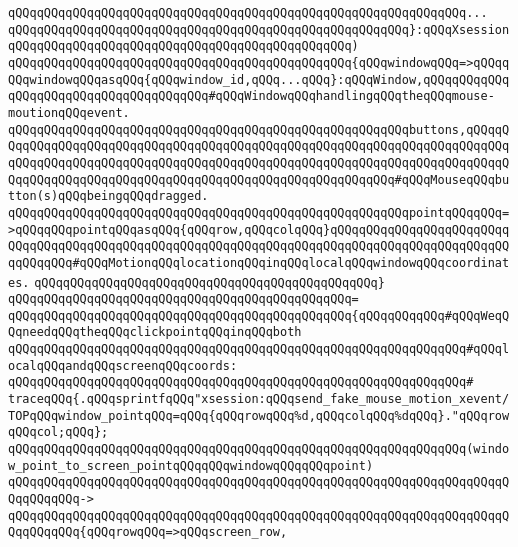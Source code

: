 \verb|qQQqqQQqqQQqqQQqqQQqqQQqqQQqqQQqqQQqqQQqqQQqqQQqqQQqqQQqqQQqqQQq...|\newline
\verb|qQQqqQQqqQQqqQQqqQQqqQQqqQQqqQQqqQQqqQQqqQQqqQQqqQQqqQQq}:qQQqXsession|\newline
\verb|qQQqqQQqqQQqqQQqqQQqqQQqqQQqqQQqqQQqqQQqqQQqqQQq)|\newline
\verb|qQQqqQQqqQQqqQQqqQQqqQQqqQQqqQQqqQQqqQQqqQQqqQQq{qQQqwindowqQQq=>qQQqqQQqwindowqQQqasqQQq{qQQqwindow_id,qQQq...qQQq}:qQQqWindow,qQQqqQQqqQQqqQQqqQQqqQQqqQQqqQQqqQQqqQQq#qQQqWindowqQQqhandlingqQQqtheqQQqmouse-moutionqQQqevent.|\newline
\verb|qQQqqQQqqQQqqQQqqQQqqQQqqQQqqQQqqQQqqQQqqQQqqQQqqQQqqQQqbuttons,qQQqqQQqqQQqqQQqqQQqqQQqqQQqqQQqqQQqqQQqqQQqqQQqqQQqqQQqqQQqqQQqqQQqqQQqqQQqqQQqqQQqqQQqqQQqqQQqqQQqqQQqqQQqqQQqqQQqqQQqqQQqqQQqqQQqqQQqqQQqqQQqqQQqqQQqqQQqqQQqqQQqqQQqqQQqqQQqqQQqqQQqqQQqqQQqqQQqqQQq#qQQqMouseqQQqbutton(s)qQQqbeingqQQqdragged.|\newline
\verb|qQQqqQQqqQQqqQQqqQQqqQQqqQQqqQQqqQQqqQQqqQQqqQQqqQQqqQQqpointqQQqqQQq=>qQQqqQQqpointqQQqasqQQq{qQQqrow,qQQqcolqQQq}qQQqqQQqqQQqqQQqqQQqqQQqqQQqqQQqqQQqqQQqqQQqqQQqqQQqqQQqqQQqqQQqqQQqqQQqqQQqqQQqqQQqqQQqqQQqqQQqqQQqqQQq#qQQqMotionqQQqlocationqQQqinqQQqlocalqQQqwindowqQQqcoordinates.|\newline
\verb|qQQqqQQqqQQqqQQqqQQqqQQqqQQqqQQqqQQqqQQqqQQqqQQq}|\newline
\verb|qQQqqQQqqQQqqQQqqQQqqQQqqQQqqQQqqQQqqQQqqQQqqQQq=|\newline
\verb|qQQqqQQqqQQqqQQqqQQqqQQqqQQqqQQqqQQqqQQqqQQqqQQq{qQQqqQQqqQQq#qQQqWeqQQqneedqQQqtheqQQqclickpointqQQqinqQQqboth|\newline
\verb|qQQqqQQqqQQqqQQqqQQqqQQqqQQqqQQqqQQqqQQqqQQqqQQqqQQqqQQqqQQqqQQq#qQQqlocalqQQqandqQQqscreenqQQqcoords:|\newline
\verb|qQQqqQQqqQQqqQQqqQQqqQQqqQQqqQQqqQQqqQQqqQQqqQQqqQQqqQQqqQQqqQQq#|\newline
\verb|traceqQQq{.qQQqsprintfqQQq"xsession:qQQqsend_fake_mouse_motion_xevent/TOPqQQqwindow_pointqQQq=qQQq{qQQqrowqQQq%d,qQQqcolqQQq%dqQQq}."qQQqrowqQQqcol;qQQq};|\newline
\verb|qQQqqQQqqQQqqQQqqQQqqQQqqQQqqQQqqQQqqQQqqQQqqQQqqQQqqQQqqQQqqQQq(window_point_to_screen_pointqQQqqQQqwindowqQQqqQQqpoint)|\newline
\verb|qQQqqQQqqQQqqQQqqQQqqQQqqQQqqQQqqQQqqQQqqQQqqQQqqQQqqQQqqQQqqQQqqQQqqQQqqQQqqQQq->|\newline
\verb|qQQqqQQqqQQqqQQqqQQqqQQqqQQqqQQqqQQqqQQqqQQqqQQqqQQqqQQqqQQqqQQqqQQqqQQqqQQqqQQq{qQQqrowqQQq=>qQQqscreen_row,|\newline
